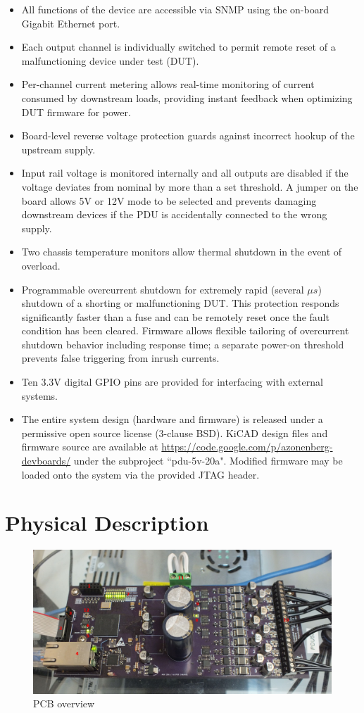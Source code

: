 \documentclass{article}
\begin{document}
\begin{itemize}
\item All functions of the device are accessible via SNMP using the on-board Gigabit Ethernet port.
\item Each output channel is individually switched to permit remote reset of a malfunctioning device under test (DUT).
\item Per-channel current metering allows real-time monitoring of current consumed by downstream loads, providing
instant feedback when optimizing DUT firmware for power.
\item Board-level reverse voltage protection guards against incorrect hookup of the upstream supply.
\item Input rail voltage is monitored internally and all outputs are disabled if the voltage deviates from nominal by 
more than a set threshold. A jumper on the board allows 5V or 12V mode to be selected and prevents damaging downstream 
devices if the PDU is accidentally connected to the wrong supply.
\item Two chassis temperature monitors allow thermal shutdown in the event of overload.
\item Programmable overcurrent shutdown for extremely rapid (several $\mu s$) shutdown of a shorting or malfunctioning
DUT. This protection responds significantly faster than a fuse and can be remotely reset once the fault condition has 
been cleared. Firmware allows flexible tailoring of overcurrent shutdown behavior including response time; a separate 
power-on threshold prevents false triggering from inrush currents.
\item Ten 3.3V  digital GPIO pins are provided for interfacing with external systems.
\item The entire system design (hardware and firmware) is released under a permissive open source license (3-clause
BSD). KiCAD design files and firmware source are available at \url{https://code.google.com/p/azonenberg-devboards/}
under the  subproject ``pdu-5v-20a". Modified firmware may be loaded onto the system via the provided JTAG header.
\end{itemize}

\pagebreak
\section{Physical Description}

\begin{figure}[h!]
\includegraphics[scale=0.15]{board-overview.jpg}
\caption{PCB overview}
\label{board-overview}
\end{figure}
\FloatBarrier
\end{document}
